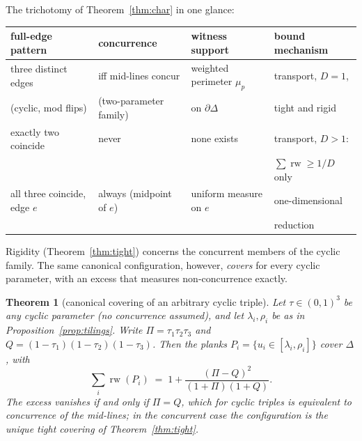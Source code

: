 \documentclass[11pt,reqno]{amsart}
\theoremstyle{plain}
\newtheorem{theorem}{Theorem}[section]
\theoremstyle{definition}
\theoremstyle{remark}
\newcommand{\rw}{\operatorname{rw}}
\begin{document}
The trichotomy of Theorem~\ref{thm:char} in one glance:

\begin{center}
\begin{tabular}{@{}llll@{}}
\hline
full-edge pattern & concurrence & witness support & bound mechanism\\
\hline
three distinct edges & iff mid-lines concur & weighted perimeter $\mu_p$
 & transport, $D=1$,\\
(cyclic, mod flips) & (two-parameter family) & on $\partial\Delta$
 & tight and rigid\\[2pt]
exactly two coincide & never & none exists & transport, $D>1$:\\
 & & & $\sum\rw\ge1/D$ only\\[2pt]
all three coincide, edge $e$ & always (midpoint of $e$) & uniform measure
on $e$ & one-dimensional\\
 & & & reduction\\
\hline
\end{tabular}
\end{center}

Rigidity (Theorem~\ref{thm:tight}) concerns the concurrent members of the
cyclic family. The same canonical configuration, however, \emph{covers} for
every cyclic parameter, with an excess that measures non-concurrence exactly.

\begin{theorem}[canonical covering of an arbitrary cyclic triple]
\label{thm:canon}
Let $\tau\in(0,1)^3$ be any cyclic parameter (no concurrence assumed), and
let $\lambda_i,\rho_i$ be as in Proposition~\ref{prop:tilings}. Write
$\Pi=\tau_1\tau_2\tau_3$ and $Q=(1-\tau_1)(1-\tau_2)(1-\tau_3)$. Then the
planks $P_i=\{u_i\in[\lambda_i,\rho_i]\}$ cover $\Delta$, with
\[
\sum_i\rw(P_i)\;=\;1+\frac{(\Pi-Q)^2}{(1+\Pi)(1+Q)} .
\]
The excess vanishes if and only if $\Pi=Q$, which for cyclic triples is
equivalent to concurrence of the mid-lines; in the concurrent case the
configuration is the unique tight covering of Theorem~\ref{thm:tight}.
\end{theorem}
\end{document}
